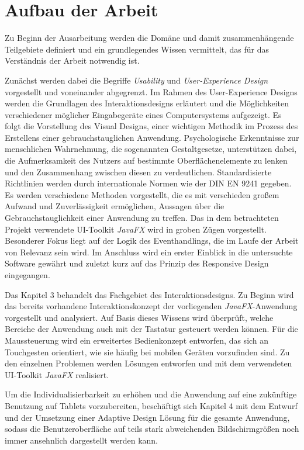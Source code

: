 \section{Aufbau der Arbeit} \label{sec:einlAufbau}
Zu Beginn der Ausarbeitung werden die Domäne und damit zusammenhängende Teilgebiete definiert und ein grundlegendes Wissen vermittelt, das für das Verständnis der Arbeit notwendig ist.\par
Zunächst werden dabei die Begriffe \textit{Usability} und \textit{User-Experience Design} vorgestellt und voneinander abgegrenzt. Im Rahmen des User-Experience Designs werden die Grundlagen des Interaktionsdesigns erläutert und die Möglichkeiten verschiedener möglicher Eingabegeräte eines Computersystems aufgezeigt. Es folgt die Vorstellung des Visual Designs, einer wichtigen Methodik im Prozess des Erstellens einer gebrauchstauglichen Anwendung. Psychologische Erkenntnisse zur menschlichen Wahrnehmung, die sogenannten Gestaltgesetze, unterstützen dabei, die Aufmerksamkeit des Nutzers auf bestimmte Oberflächenelemente zu lenken und den Zusammenhang zwischen diesen zu verdeutlichen. Standardisierte Richtlinien werden durch internationale Normen wie der DIN EN 9241 gegeben. Es werden verschiedene Methoden vorgestellt, die es mit verschieden großem Aufwand und Zuverlässigkeit ermöglichen, Aussagen über die Gebrauchstauglichkeit einer Anwendung zu treffen. Das in dem betrachteten Projekt verwendete UI-Toolkit \textit{JavaFX} wird in groben Zügen vorgestellt. Besonderer Fokus liegt auf der Logik des Eventhandlings, die im Laufe der Arbeit von Relevanz sein wird. Im Anschluss wird ein erster Einblick in die untersuchte Software gewährt und zuletzt kurz auf das Prinzip des Responsive Design eingegangen.\par
Das Kapitel 3 behandelt das Fachgebiet des Interaktionsdesigns. Zu Beginn wird das bereits vorhandene Interaktionskonzept der vorliegenden \textit{JavaFX}-Anwendung vorgestellt und analysiert. Auf Basis dieses Wissens wird überprüft, welche Bereiche der Anwendung auch mit der Tastatur gesteuert werden können. Für die Maussteuerung wird ein erweitertes Bedienkonzept entworfen, das sich an Touchgesten orientiert, wie sie häufig bei mobilen Geräten vorzufinden sind. Zu den einzelnen Problemen werden Lösungen entworfen und mit dem verwendeten UI-Toolkit \textit{JavaFX} realisiert.\par
Um die Individualisierbarkeit zu erhöhen und die Anwendung auf eine zukünftige Benutzung auf Tablets vorzubereiten, beschäftigt sich Kapitel 4 mit dem Entwurf und der Umsetzung einer Adaptive Design Lösung für die gesamte Anwendung, sodass die Benutzeroberfläche auf teils stark abweichenden Bildschirmgrößen noch immer ansehnlich dargestellt werden kann.\par
